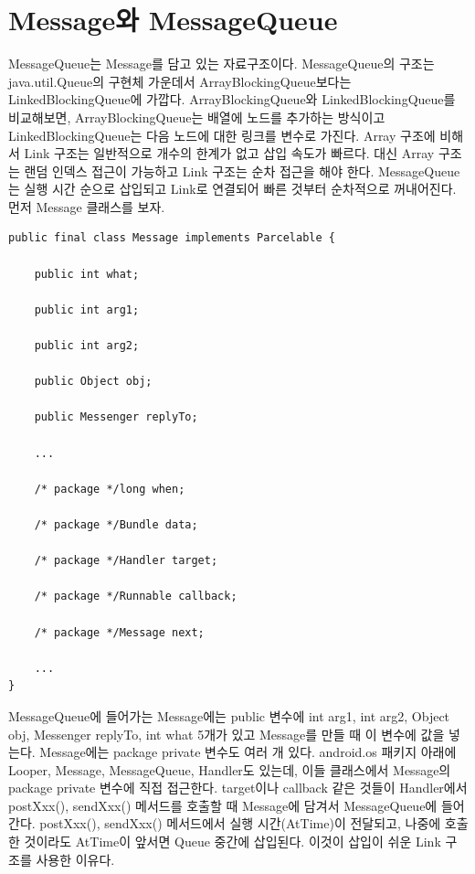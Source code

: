 \section{Message와 MessageQueue}
\label{sec:messagequeue}
MessageQueue는 Message를 담고 있는 자료구조이다.
MessageQueue의 구조는 java.util.Queue의 구현체 가운데서 ArrayBlockingQueue보다는 LinkedBlockingQueue에 가깝다. 
ArrayBlockingQueue와 LinkedBlockingQueue를 비교해보면, ArrayBlockingQueue는 배열에 노드를 추가하는 방식이고 LinkedBlockingQueue는 다음 노드에 대한 링크를 변수로 가진다.
Array 구조에 비해서 Link 구조는 일반적으로 개수의 한계가 없고 삽입 속도가 빠르다. 
대신 Array 구조는 랜덤 인덱스 접근이 가능하고 Link 구조는 순차 접근을 해야 한다. 
MessageQueue는 실행 시간 순으로 삽입되고 Link로 연결되어 빠른 것부터 순차적으로 꺼내어진다.\\

먼저 Message 클래스를 보자.
\begin{lstlisting}[frame=single, caption=Message.java] 
public final class Message implements Parcelable {

	public int what;

	public int arg1;

	public int arg2;

	public Object obj;

	public Messenger replyTo;
	
	...

	/* package */long when;

	/* package */Bundle data;

	/* package */Handler target;

	/* package */Runnable callback;

	/* package */Message next;
	
	...
}
\end{lstlisting}
MessageQueue에 들어가는 Message에는 public 변수에 int arg1, int arg2, Object obj, Messenger replyTo, int what 5개가 있고 Message를 만들 때 이 변수에 값을 넣는다.
Message에는 package private 변수도 여러 개 있다.
android.os 패키지 아래에 Looper, Message, MessageQueue, Handler도 있는데, 이들 클래스에서 Message의 package private 변수에 직접 접근한다. 
target이나 callback 같은 것들이 Handler에서 postXxx(), sendXxx() 메서드를 호출할 때 Message에 담겨서 MessageQueue에 들어간다. 
postXxx(), sendXxx() 메서드에서 실행 시간(AtTime)이 전달되고, 나중에 호출한 것이라도 AtTime이 앞서면 Queue 중간에 삽입된다. 
이것이 삽입이 쉬운 Link 구조를 사용한 이유다.\\

